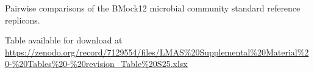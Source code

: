 \begin{table}[]
\centering
\caption{Pairwise comparisons of the BMock12 microbial community standard reference replicons.}
\label{tab:ch5_suptable25}
Table available for download at \url{https://zenodo.org/record/7129554/files/LMAS\%20Supplemental\%20Material\%20-\%20Tables\%20-\%20revision_Table\%20S25.xlsx}
\end{table}